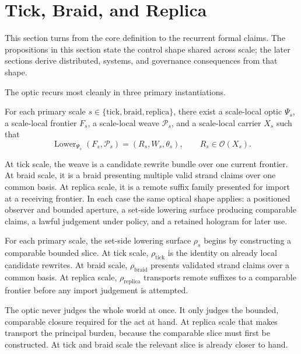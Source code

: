 \documentclass{aion}
\begin{document}
\clearpage
\section{Tick, Braid, and Replica}
\label{sec:scales}

This section turns from the core definition to the recurrent formal claims. The
propositions in this section state the control shape shared across scale; the later
sections derive distributed, systems, and governance consequences from that
shape.

The optic recurs most cleanly in three primary instantiations.

\begin{proposition}
	For each primary scale
	\(s \in \{\mathrm{tick}, \mathrm{braid}, \mathrm{replica}\}\),
	there exist a scale-local optic \(\Psi_s\), a scale-local frontier \(F_s\), a
	scale-local weave \(\mathcal{P}_s\), and a scale-local
	carrier \(X_s\) such that
	\[
		\operatorname{Lower}_{\Psi_s}(F_s, \mathcal{P}_s)
		=
		(R_s,W_s,\theta_s),
		\qquad
		R_s \in \mathcal{O}(X_s).
	\]
\end{proposition}

\begin{argument}
	At tick scale, the weave is a candidate rewrite bundle over
	one current frontier. At braid scale, it is a braid presenting multiple valid
	strand claims over one common basis. At replica scale, it is a remote suffix
	family presented for import at a receiving frontier. In each case the same
	optical shape applies: a positioned observer and bounded aperture, a set-side
	lowering surface producing comparable claims, a lawful judgement under policy,
	and a retained hologram for later use.
\end{argument}

\begin{corollary}
\label{cor:slicing-boundary}
	For each primary scale, the set-side lowering surface \(\rho_s\) begins by
	constructing a comparable bounded slice. At tick scale, \(\rho_{\mathrm{tick}}\)
	is the identity on already local candidate rewrites. At braid scale,
	\(\rho_{\mathrm{braid}}\) presents validated strand claims over a common basis.
	At replica scale, \(\rho_{\mathrm{replica}}\) transports remote suffixes to a
	comparable frontier before any import judgement is attempted.
\end{corollary}

\begin{argument}
	The optic never judges the whole world at once. It only judges the bounded,
	comparable closure required for the act at hand. At replica scale that makes
	transport the principal burden, because the comparable slice must first be
	constructed. At tick and braid scale the relevant slice is already closer to
	hand.
\end{argument}
\end{document}
